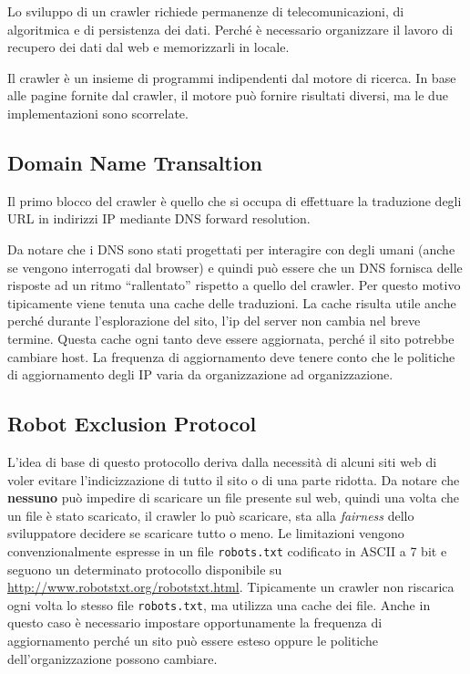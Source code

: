 

Lo sviluppo di un crawler richiede permanenze di telecomunicazioni, di algoritmica e di persistenza dei dati. Perché è necessario organizzare il lavoro di recupero dei dati dal web e memorizzarli in locale.

Il crawler è un insieme di programmi indipendenti dal motore di ricerca. In base alle pagine fornite dal crawler, il motore può fornire risultati diversi, ma le due implementazioni sono scorrelate.

\subsection{Domain Name Transaltion}

Il primo blocco del crawler è quello che si occupa di effettuare la traduzione degli URL in indirizzi IP mediante DNS forward resolution.

Da notare che i DNS sono stati progettati per interagire con degli umani (anche se vengono interrogati dal browser) e quindi può essere che un DNS fornisca delle risposte ad un ritmo ``rallentato'' rispetto a quello del crawler. Per questo motivo tipicamente viene tenuta una cache delle traduzioni.
La cache risulta utile anche perché durante l'esplorazione del sito, l'ip del server non cambia nel breve termine. 
Questa cache ogni tanto deve essere aggiornata, perché il sito potrebbe cambiare host. La frequenza di aggiornamento deve tenere conto che le politiche di aggiornamento degli IP varia da organizzazione ad organizzazione.

\subsection{Robot Exclusion Protocol}

L'idea di base di questo protocollo deriva dalla necessità di alcuni siti web di voler evitare l'indicizzazione di tutto il sito o di una parte ridotta.
Da notare che \textbf{nessuno} può impedire di scaricare un file presente sul web, quindi una volta che un file è stato scaricato, il crawler lo può scaricare, sta alla \textit{fairness} dello sviluppatore decidere se scaricare tutto o meno.
Le limitazioni vengono convenzionalmente espresse in un file \texttt{robots.txt} codificato in ASCII a 7 bit e seguono un determinato protocollo disponibile su \url{http://www.robotstxt.org/robotstxt.html}.
Tipicamente un crawler non riscarica ogni volta lo stesso file \texttt{robots.txt}, ma utilizza una cache dei file.
Anche in questo caso è necessario impostare opportunamente la frequenza di aggiornamento perché un sito può essere esteso oppure le politiche dell'organizzazione possono cambiare.

